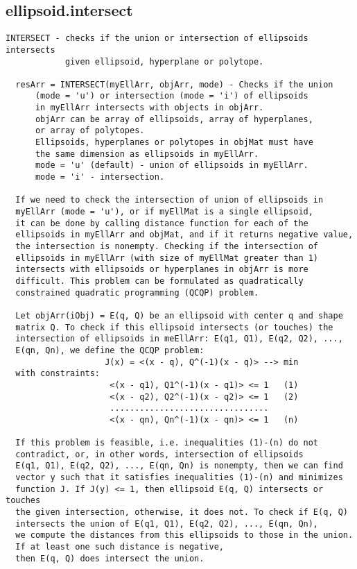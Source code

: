 \subsection{\texorpdfstring{ellipsoid.intersect}{intersect}}\label{method:ellipsoid.intersect}
\begin{verbatim}
INTERSECT - checks if the union or intersection of ellipsoids intersects
            given ellipsoid, hyperplane or polytope.

  resArr = INTERSECT(myEllArr, objArr, mode) - Checks if the union
      (mode = 'u') or intersection (mode = 'i') of ellipsoids
      in myEllArr intersects with objects in objArr.
      objArr can be array of ellipsoids, array of hyperplanes,
      or array of polytopes.
      Ellipsoids, hyperplanes or polytopes in objMat must have
      the same dimension as ellipsoids in myEllArr.
      mode = 'u' (default) - union of ellipsoids in myEllArr.
      mode = 'i' - intersection.

  If we need to check the intersection of union of ellipsoids in
  myEllArr (mode = 'u'), or if myEllMat is a single ellipsoid,
  it can be done by calling distance function for each of the
  ellipsoids in myEllArr and objMat, and if it returns negative value,
  the intersection is nonempty. Checking if the intersection of
  ellipsoids in myEllArr (with size of myEllMat greater than 1)
  intersects with ellipsoids or hyperplanes in objArr is more
  difficult. This problem can be formulated as quadratically
  constrained quadratic programming (QCQP) problem.

  Let objArr(iObj) = E(q, Q) be an ellipsoid with center q and shape
  matrix Q. To check if this ellipsoid intersects (or touches) the
  intersection of ellipsoids in meEllArr: E(q1, Q1), E(q2, Q2), ...,
  E(qn, Qn), we define the QCQP problem:
                    J(x) = <(x - q), Q^(-1)(x - q)> --> min
  with constraints:
                     <(x - q1), Q1^(-1)(x - q1)> <= 1   (1)
                     <(x - q2), Q2^(-1)(x - q2)> <= 1   (2)
                     ................................
                     <(x - qn), Qn^(-1)(x - qn)> <= 1   (n)

  If this problem is feasible, i.e. inequalities (1)-(n) do not
  contradict, or, in other words, intersection of ellipsoids
  E(q1, Q1), E(q2, Q2), ..., E(qn, Qn) is nonempty, then we can find
  vector y such that it satisfies inequalities (1)-(n) and minimizes
  function J. If J(y) <= 1, then ellipsoid E(q, Q) intersects or touches
  the given intersection, otherwise, it does not. To check if E(q, Q)
  intersects the union of E(q1, Q1), E(q2, Q2), ..., E(qn, Qn),
  we compute the distances from this ellipsoids to those in the union.
  If at least one such distance is negative,
  then E(q, Q) does intersect the union.


\end{verbatim}
